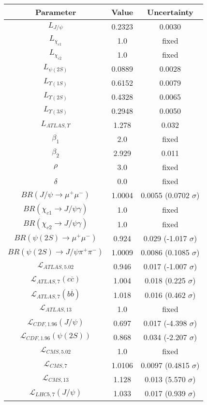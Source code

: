 \begin{table}[h!]
\centering
\begin{tabular}{c|c|c}
Parameter & Value & Uncertainty \\
\hline
$L_{J/\psi}$ & 0.2323 & 0.0030 \\
$L_{\chi_{c1}}$ & 1.0 & fixed \\
$L_{\chi_{c2}}$ & 1.0 & fixed \\
$L_{\psi(2S)}$ & 0.0889 & 0.0028 \\
$L_{\Upsilon(1S)}$ & 0.6152 & 0.0079 \\
$L_{\Upsilon(2S)}$ & 0.4328 & 0.0065 \\
$L_{\Upsilon(3S)}$ & 0.2948 & 0.0050 \\
$L_{ATLAS,\Upsilon}$ & 1.278 & 0.032 \\
$\beta_1$ & 2.0 & fixed \\
$\beta_2$ & 2.929 & 0.011 \\
$\rho$ & 3.0 & fixed \\
$\delta$ & 0.0 & fixed \\
$BR(J/\psi\rightarrow\mu^+\mu^-)$ & 1.0004 & 0.0055 (0.0702 $\sigma$) \\
$BR(\chi_{c1}\rightarrow J/\psi\gamma)$ & 1.0 & fixed \\
$BR(\chi_{c2}\rightarrow J/\psi\gamma)$ & 1.0 & fixed \\
$BR(\psi(2S)\rightarrow\mu^+\mu^-)$ & 0.924 & 0.029 (-1.017 $\sigma$) \\
$BR(\psi(2S)\rightarrow J/\psi\pi^+\pi^-)$ & 1.0009 & 0.0086 (0.1085 $\sigma$) \\
$\mathcal L_{ATLAS,5.02}$ & 0.946 & 0.017 (-1.007 $\sigma$) \\
$\mathcal L_{ATLAS,7}(c\overline c)$ & 1.004 & 0.018 (0.225 $\sigma$) \\
$\mathcal L_{ATLAS,7}(b\overline b)$ & 1.018 & 0.016 (0.462 $\sigma$) \\
$\mathcal L_{ATLAS,13}$ & 1.0 & fixed \\
$\mathcal L_{CDF,1.96}(J/\psi)$ & 0.697 & 0.017 (-4.398 $\sigma$) \\
$\mathcal L_{CDF,1.96}(\psi(2S))$ & 0.868 & 0.034 (-2.207 $\sigma$) \\
$\mathcal L_{CMS,5.02}$ & 1.0 & fixed \\
$\mathcal L_{CMS,7}$ & 1.0106 & 0.0097 (0.4815 $\sigma$) \\
$\mathcal L_{CMS,13}$ & 1.128 & 0.013 (5.570 $\sigma$) \\
$\mathcal L_{LHCb,7}(J/\psi)$ & 1.033 & 0.017 (0.939 $\sigma$) \\

\end{tabular}
\end{table}
